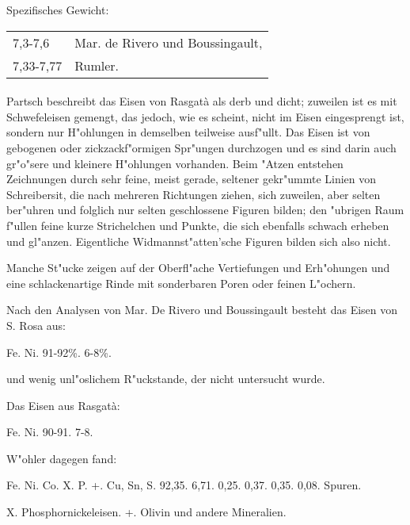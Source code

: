 \documentclass[a4paper, 11pt, oneside]{article}
\begin{document}
Spezifisches Gewicht:  
\begin{table}[!ht]
    \centering
    \begin{tabular}{l l}
        7,3-7,6 & Mar. de Rivero und Boussingault,\\
        7,33-7,77 & Rumler.
    \end{tabular}
\end{table}
\paragraph{}
Partsch beschreibt das Eisen von Rasgatà als derb und dicht; zuweilen ist es mit Schwefeleisen gemengt, das jedoch, wie es scheint, nicht im Eisen eingesprengt ist, sondern nur H"ohlungen in demselben teilweise ausf"ullt. Das Eisen ist von gebogenen oder zickzackf"ormigen Spr"ungen durchzogen und es sind darin auch gr"o"sere und kleinere H"ohlungen vorhanden. Beim "Atzen entstehen Zeichnungen durch sehr feine, meist gerade, seltener gekr"ummte Linien von Schreibersit, die nach mehreren Richtungen ziehen, sich zuweilen, aber selten ber"uhren und folglich nur selten geschlossene Figuren bilden; den "ubrigen Raum f"ullen feine kurze Strichelchen und Punkte, die sich ebenfalls schwach erheben und gl"anzen. Eigentliche Widmannst"atten'sche Figuren bilden sich also nicht.

Manche St"ucke zeigen auf der Oberfl"ache Vertiefungen und Erh"ohungen und eine schlackenartige Rinde mit sonderbaren Poren oder feinen L"ochern.

Nach den Analysen von Mar. De Rivero und Boussingault besteht das Eisen von S. Rosa aus:

Fe. Ni.  
91-92\%.  6-8\%.

und wenig unl"oslichem R"uckstande, der nicht untersucht wurde.

Das Eisen aus Rasgatà:  

Fe. Ni.  
90-91. 7-8.

W"ohler dagegen fand:

Fe. Ni. Co. X. P. +. Cu, Sn, S.  
92,35. 6,71. 0,25. 0,37. 0,35. 0,08. Spuren.

X. Phosphornickeleisen.  
+. Olivin und andere Mineralien.
\end{document}
